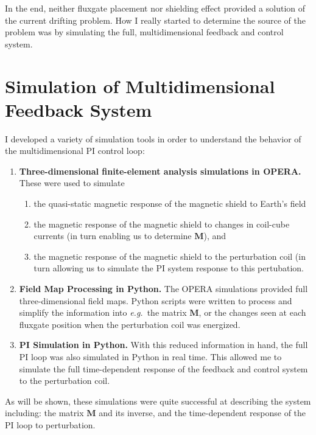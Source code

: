 

In the end, neither fluxgate placement nor shielding effect provided a
solution of the current drifting problem.  How I really started to
determine the source of the problem was by simulating the full,
multidimensional feedback and control system.

\section{Simulation of Multidimensional Feedback System}\label{sec:pSim}

I developed a variety of simulation tools in order to understand the
behavior of the multidimensional PI control loop:
\begin{enumerate}
\item {\bf Three-dimensional finite-element analysis simulations in OPERA.}  These were used to simulate
\begin{enumerate}
\item the quasi-static magnetic response of the magnetic shield to Earth's field
\item the magnetic response of the magnetic shield to changes in coil-cube currents (in turn enabling us to determine $\bm{M}$), and
\item the magnetic response of the magnetic shield to the perturbation coil (in turn allowing us to simulate the PI system response to this pertubation.
\end{enumerate}
\item {\bf Field Map Processing in Python.}  The OPERA simulations provided full three-dimensional field maps.  Python scripts were written to process and simplify the information into {\it e.g.}~the matrix $\bm{M}$, or the changes seen at each fluxgate position when the perturbation coil was energized.
\item {\bf PI Simulation in Python.}  With this reduced information in hand, the full PI loop was also simulated in Python in real time.  This allowed me to simulate the full time-dependent response of the feedback and control system to the perturbation coil.
\end{enumerate}
As will be shown, these simulations were quite successful at
describing the system including: the matrix $\bm{M}$ and its
inverse, and the time-dependent response of the PI loop to
perturbation.

